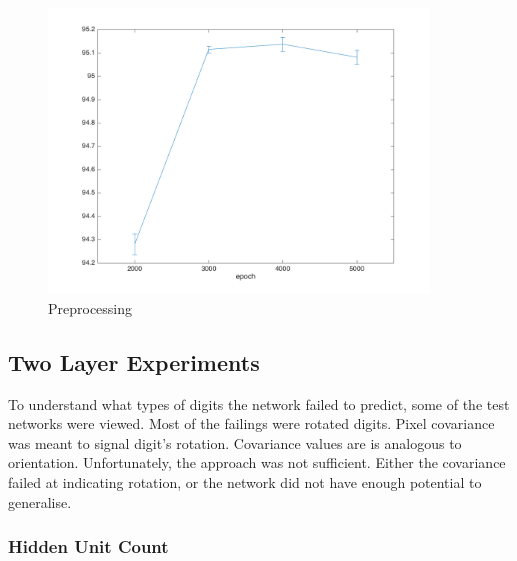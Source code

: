 \documentclass[11]{article}
\begin{document}
\begin{figure}
\centering
\includegraphics[width=0.9\textwidth]{normalised.png}
\caption{Preprocessing}
\label{fig:normalised}
\end{figure}

\subsection{Two Layer Experiments}

To understand what types of digits the network failed to predict, some of the test networks were viewed.  Most of the failings were rotated digits. Pixel covariance was meant to signal digit's rotation.  Covariance values are is analogous to orientation. Unfortunately, the approach was not sufficient. Either the covariance failed at indicating rotation, or the network did not have enough potential to generalise. 

\subsubsection{Hidden Unit Count}
\end{document}
